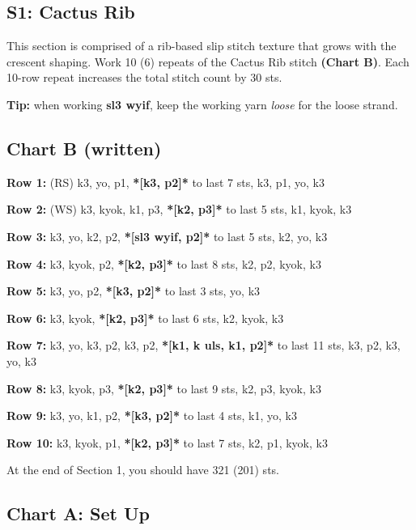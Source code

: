 \documentclass[12pt]{article}
\newcommand{\rowDir}[1]{\textbf{#1:}} %
\renewcommand{\repeat}[1]{\textbf{*[#1]*}} %
\newenvironment{frnote}
    {%
    	\setlength{\FrameRule}{1.5pt}
    	\def\FrameCommand{\fboxrule=\FrameRule\fboxsep=\FrameSep \fcolorbox{framecolor}{shadecolor}}
    	\MakeFramed {\FrameRestore}}
    {\setlength{\FrameRule}{1pt}
	\endMakeFramed}
\newenvironment{unframed}
    {%
	\setlength{\parindent}{-2em}
	\begin{addmargin}[2em]{0pt}}
    {\end{addmargin}
	\setlength{\parindent}{0em}}
\begin{document}
\begin{multicols}{2}
\section*{S1: Cactus Rib}

This section is comprised of a rib-based slip stitch texture that grows with the crescent shaping. Work 10 (6) repeats of the Cactus Rib stitch \textbf{(Chart B)}. Each 10-row repeat increases the total stitch count by 30 sts.

\begin{frnote}
\textbf{Tip:} when working \textbf{sl3 wyif}, keep the working yarn \emph{loose} for the loose strand.
\end{frnote}

\subsection*{Chart B (written)}
\begin{unframed}
\hspace{-2em}\rowDir{Row 1} (RS) k3, yo, p1, \repeat{k3, p2} to last 7 sts, k3, p1, yo, k3

\rowDir{Row 2} (WS) k3, kyok, k1, p3, \repeat{k2, p3} to last 5 sts, k1, kyok, k3

\rowDir{Row 3} k3, yo, k2, p2, \repeat{sl3 wyif, p2} to last 5 sts, k2, yo, k3

\rowDir{Row 4} k3, kyok, p2, \repeat{k2, p3} to last 8 sts, k2, p2, kyok, k3

\rowDir{Row 5} k3, yo, p2, \repeat{k3, p2} to last 3 sts, yo, k3

\rowDir{Row 6} k3, kyok, \repeat{k2, p3} to last 6 sts, k2, kyok, k3

\rowDir{Row 7} k3, yo, k3, p2, k3, p2, \repeat{k1, k uls, k1, p2} to last 11 sts, k3, p2, k3, yo, k3

\rowDir{Row 8} k3, kyok, p3, \repeat{k2, p3} to last 9 sts, k2, p3, kyok, k3

\rowDir{Row 9} k3, yo, k1, p2, \repeat{k3, p2} to last 4 sts, k1, yo, k3

\rowDir{Row 10} k3, kyok, p1, \repeat{k2, p3} to last 7 sts, k2, p1, kyok, k3
\end{unframed}

\vspace{1em}
At the end of Section 1, you should have 321 (201) sts.


\end{multicols}
\subsection*{Chart A: Set Up}
\end{document}
